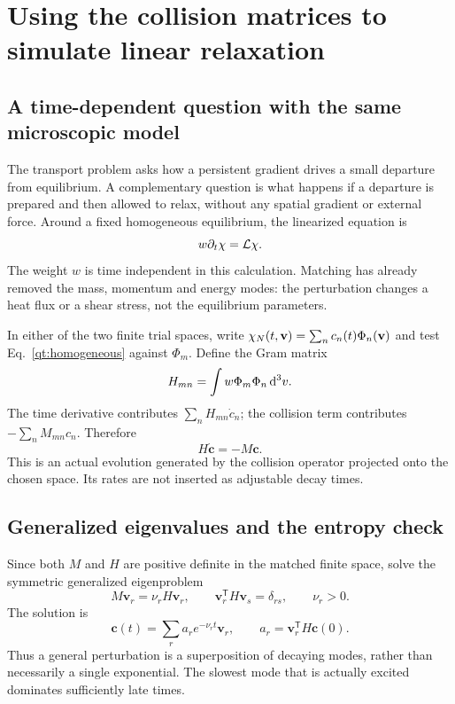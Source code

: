 \section{Using the collision matrices to simulate linear relaxation}
\label{qt:dynamics}
\subsection{A time-dependent question with the same microscopic model}
The transport problem asks how a persistent gradient drives a small departure
from equilibrium. A complementary question is what happens if a departure is
prepared and then allowed to relax, without any spatial gradient or external
force. Around a fixed homogeneous equilibrium, the linearized equation is
\begin{equation}
 w\partial_t\chi=\mathcal L\chi.
 \label{qt:homogeneous}
\end{equation}
The weight $w$ is time independent in this calculation. Matching has already
removed the mass, momentum and energy modes: the perturbation changes a heat
flux or a shear stress, not the equilibrium parameters.

In either of the two finite trial spaces, write
$\chi_N(t,\mathbf v)=\sum_nc_n(t)\Phi_n(\mathbf v)$ and test
Eq.~\eqref{qt:homogeneous} against $\Phi_m$. Define the Gram matrix
\begin{equation}
 H_{mn}=\int w\Phi_m\Phi_n\,\mathrm d^3v.
\end{equation}
The time derivative contributes $\sum_nH_{mn}\dot c_n$; the collision term
contributes $-\sum_nM_{mn}c_n$. Therefore
\begin{equation}
 \boxed{H\dot{\boldsymbol c}=-M\boldsymbol c.}
 \label{qt:ode}
\end{equation}
This is an actual evolution generated by the collision operator projected
onto the chosen space. Its rates are not inserted as adjustable decay times.

\subsection{Generalized eigenvalues and the entropy check}
Since both $M$ and $H$ are positive definite in the matched finite space,
solve the symmetric generalized eigenproblem
\begin{equation}
 M\boldsymbol v_r=\nu_rH\boldsymbol v_r,\qquad
 \boldsymbol v_r^{\mathsf T}H\boldsymbol v_s=\delta_{rs},\qquad \nu_r>0.
\end{equation}
The solution is
\begin{equation}
 \boldsymbol c(t)=\sum_r a_r e^{-\nu_rt}\boldsymbol v_r,\qquad
 a_r=\boldsymbol v_r^{\mathsf T}H\boldsymbol c(0).
 \label{qt:decay}
\end{equation}
Thus a general perturbation is a superposition of decaying modes, rather than
necessarily a single exponential. The slowest mode that is actually excited
dominates sufficiently late times.

